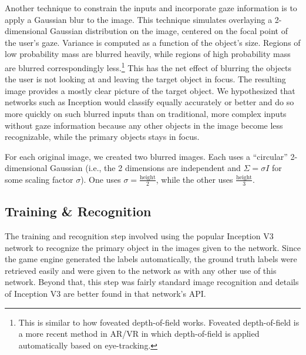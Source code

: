 Another technique to constrain the inputs and incorporate gaze information is to
apply a Gaussian blur to the image. This technique simulates overlaying a
2-dimensional Gaussian distribution on the image, centered on the focal point of
the user's gaze. Variance is computed as a function of the object's size.
Regions of low probability mass are blurred heavily, while regions of high
probability mass are blurred correspondingly less.\footnote{This is similar to
how foveated depth-of-field works. Foveated depth-of-field is a more recent
method in AR/VR in which depth-of-field is applied automatically based on
eye-tracking.} This has the net effect of blurring the objects the user is not
looking at and leaving the target object in focus. The resulting image provides
a mostly clear picture of the target object. We hypothesized that networks such
as Inception would classify equally accurately or better and do so more quickly
on such blurred inputs than on traditional, more complex inputs without gaze
information because any other objects in the image become less recognizable,
while the primary objects stays in focus.

For each original image, we created two blurred images. Each uses a ``circular''
2-dimensional Gaussian (i.e., the 2 dimensions are independent and \(\Sigma =
\sigma I\) for some scaling factor \(\sigma\)). One uses \(\sigma =
\frac{\text{height}}{2}\), while the other uses \(\frac{\text{height}}{3}\).


\subsection{Training \& Recognition}

The training and recognition step involved using the popular Inception V3
network to recognize the primary object in the images given to the network.
Since the game engine generated the labels automatically, the ground truth
labels were retrieved easily and were given to the network as with any other use
of this network. Beyond that, this step was fairly standard image recognition and
details of Inception V3 are better found in that network's API\@.
